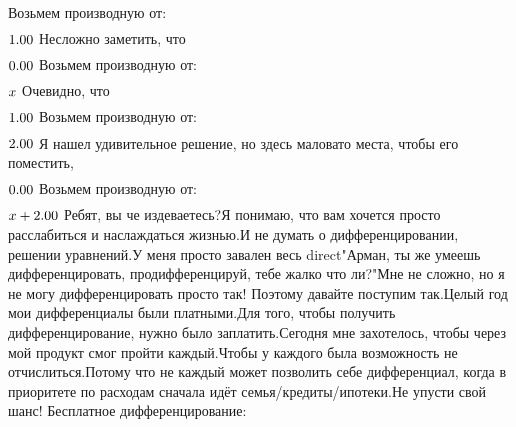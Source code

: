 Возьмем производную от:
\begin{gather}
\end{gather}
\begin{math}
1.00 \\
\end{math}
Несложно заметить, что
\begin{gather}
\end{gather}
\begin{math}
0.00 \\
\end{math}
Возьмем производную от:
\begin{gather}
\end{gather}
\begin{math}
x \\
\end{math}
Очевидно, что
\begin{gather}
\end{gather}
\begin{math}
1.00 \\
\end{math}
Возьмем производную от:
\begin{gather}
\end{gather}
\begin{math}
2.00 \\
\end{math}
Я нашел удивительное решение, но здесь маловато места, чтобы его поместить, 
\begin{gather}
\end{gather}
\begin{math}
0.00 \\
\end{math}
Возьмем производную от:
\begin{gather}
\end{gather}
\begin{math}
x + 2.00 \\
\end{math}
Ребят, вы че издеваетесь?Я понимаю, что вам хочется просто расслабиться и наслаждаться жизнью.И не думать о дифференцировании, решении уравнений.У меня просто завален весь direct"Арман, ты же умеешь дифференцировать, продифференцируй, тебе жалко что ли?"Мне не сложно, но я не могу дифференцировать просто так! Поэтому давайте поступим так.Целый год мои дифференциалы были платными.Для того, чтобы получить дифференцирование, нужно было заплатить.Сегодня мне захотелось, чтобы через мой продукт смог пройти каждый.Чтобы у каждого была возможность не отчислиться.Потому что не каждый может позволить себе дифференциал, когда в приоритете по расходам сначала идёт семья/кредиты/ипотеки.Не упусти свой шанс! Бесплатное дифференцирование: 
